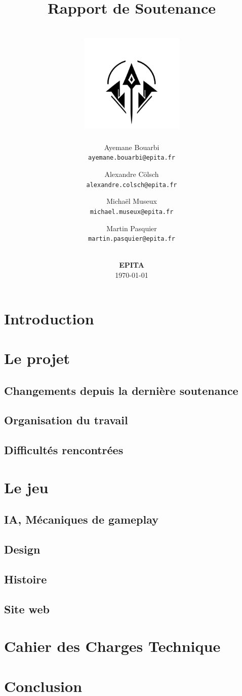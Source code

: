 \documentclass[12pt]{article}
\title{
    Rapport de Soutenance \\
    \textbf{\gameName} \\
    \vspace{0.5cm}
    \includegraphics[width=5cm]{0.format/logo.png}
    \vspace{4.2cm}
}
\author{
    Ayemane Bouarbi \\
    \texttt{ayemane.bouarbi@epita.fr}
    \vspace{0.5cm}\and
    Alexandre Cölsch \\
    \texttt{alexandre.colsch@epita.fr}
    \vspace{0.5cm}\and
    Michaël Museux \\
    \texttt{michael.museux@epita.fr}
    \vspace{0.5cm}\and
    Martin Pasquier \\
    \texttt{martin.pasquier@epita.fr}
}
\date{
    \vspace{1.5cm}
    \textbf{\companyName} \\
    \vspace{0.3cm}
    \textbf{EPITA} \\
    \vspace{1.5cm}
    \today
}
\begin{document}
\begin{titlepage}
    \maketitle
    \thispagestyle{empty} %
\end{titlepage}

\newpage
\thispagestyle{empty}
\mbox{}

\newpage
\tableofcontents

\newpage
\section{Introduction}



\newpage
\section{Le projet}

\subsection{Changements depuis la dernière soutenance}


\subsection{Organisation du travail}


\subsection{Difficultés rencontrées}



\newpage
\section{Le jeu}

\subsection{IA, Mécaniques de gameplay}


\subsection{Design}


\subsection{Histoire}


\subsection{Site web}



\newpage
\section{Cahier des Charges Technique}


\newpage
\section{Conclusion}

\end{document}
